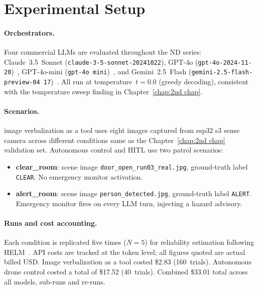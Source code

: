 \section{Experimental Setup}
\label{sec:ch4_setup}

\paragraph{Orchestrators.} Four commercial LLMs are evaluated throughout the ND series: Claude~3.5~Sonnet
(\texttt{claude-3-5-sonnet-20241022}), GPT-4o (\texttt{gpt-4o-2024-11-20})~\cite{achiam2023gpt4},
GPT-4o-mini (\texttt{gpt-4o mini})~\cite{achiam2023gpt4}, and Gemini~2.5~Flash
(\texttt{gemini-2.5-flash-preview-04 17})~\cite{reid2024gemini}.
All run at temperature~$t=0.0$ (greedy decoding), consistent with the temperature sweep finding in Chapter~\ref{chap:2nd chap}.

\paragraph{Scenarios.}
image verbalization as a tool uses eight images captured from esp32 s3 sense camera across different conditions same as the Chapter~\ref{chap:2nd chap} validation set.
Autonomous control and HITL use two patrol scenarios:
\begin{itemize}
  \item \textbf{clear\_room}: scene image \texttt{door\_open\_run03\_real.jpg}, ground-truth label \texttt{CLEAR}.  
  No emergency monitor activation.
  \item \textbf{alert\_room}: scene image \texttt{person\_detected.jpg}, ground-truth label \texttt{ALERT}.  
Emergency monitor fires on every LLM turn, injecting a hazard advisory.
\end{itemize}

\paragraph{Runs and cost accounting.}
Each condition is replicated five times ($N=5$) for reliability estimation following HELM~\cite{liang2023helm}.  
API costs are tracked at the token level; all figures quoted are actual billed USD.  
Image verbalization as a tool costed \$2.83 (160~trials).
Autonomous drone control costed a total of \$17.52 (40~trials).
Combined \$33.01 total across all models, sub-runs and re-runs.

